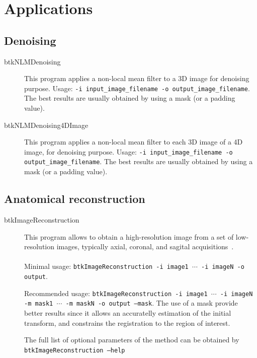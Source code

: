 \section{Applications}

\subsection{Denoising}

\begin{description}
 \item[btkNLMDenoising] This program applies a non-local mean filter to a 3D image for denoising purpose. Usage: \texttt{-i input\_image\_filename -o output\_image\_filename}. The best results are usually obtained by using a mask (or a padding value).
\end{description}

\begin{description}
 \item[btkNLMDenoising4DImage] This program applies a non-local mean filter to each 3D image of a 4D image, for denoising purpose. Usage: \texttt{-i input\_image\_filename -o output\_image\_filename}. The best results are usually obtained by using a mask (or a padding value).
\end{description}


\subsection{Anatomical reconstruction}

\begin{description}
 \item[btkImageReconstruction] This program allows to obtain a
high-resolution image from a set of low-resolution images, typically
axial, coronal, and sagital acquisitions~\cite{Rousseau2006}. \\\\
Minimal usage: \texttt{btkImageReconstruction -i image1 $\cdots$ -i imageN -o
output}. 

Recommended usage: \texttt{btkImageReconstruction -i image1 $\cdots$ -i imageN
-m mask1 $\cdots$ -m maskN -o output --mask}. The use of a mask provide
better results since it allows an accuratelly estimation of the initial
transform, and constrains the registration to the region of interest.

The full list of optional parameters of the method can be obtained by
\texttt{btkImageReconstruction --help}

\end{description}

